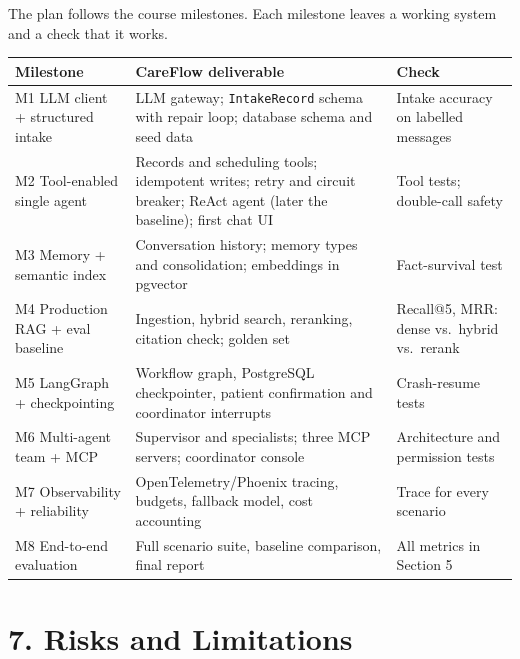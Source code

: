 \documentclass[11pt,a4paper]{article}
\begin{document}
The plan follows the course milestones. Each milestone leaves a working system and a check that it works.

\begin{center}
\small
\begin{tabularx}{\textwidth}{>{\raggedright\arraybackslash}p{4.3cm} L >{\raggedright\arraybackslash}p{3.6cm}}
\toprule
\textbf{Milestone} & \textbf{CareFlow deliverable} & \textbf{Check} \\
\midrule
M1 LLM client + structured intake & LLM gateway; \texttt{IntakeRecord} schema with repair loop; database schema and seed data & Intake accuracy on labelled messages \\
M2 Tool-enabled single agent & Records and scheduling tools; idempotent writes; retry and circuit breaker; ReAct agent (later the baseline); first chat UI & Tool tests; double-call safety \\
M3 Memory + semantic index & Conversation history; memory types and consolidation; embeddings in pgvector & Fact-survival test \\
M4 Production RAG + eval baseline & Ingestion, hybrid search, reranking, citation check; golden set & Recall@5, MRR: dense vs.\ hybrid vs.\ rerank \\
M5 LangGraph + checkpointing & Workflow graph, PostgreSQL checkpointer, patient confirmation and coordinator interrupts & Crash-resume tests \\
M6 Multi-agent team + MCP & Supervisor and specialists; three MCP servers; coordinator console & Architecture and permission tests \\
M7 Observability + reliability & OpenTelemetry/Phoenix tracing, budgets, fallback model, cost accounting & Trace for every scenario \\
M8 End-to-end evaluation & Full scenario suite, baseline comparison, final report & All metrics in Section 5 \\
\bottomrule
\end{tabularx}
\end{center}

\section*{7. Risks and Limitations}
\end{document}
